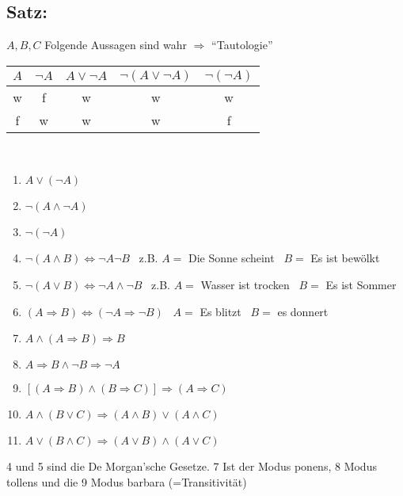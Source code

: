 \subsection{Satz:}
$A,B,C$ Folgende Aussagen sind wahr $\Rightarrow$ "`Tautologie"'
\begin{center}
\begin{tabular}{cc||ccc}
$A$ & $\neg A$ & $A \vee \neg A$ & $\neg(A\vee \neg A)$ & $\neg(\neg A)$\\ \hline
w & f & w & w & w\\
f & w & w & w & f\\
\end{tabular}
\end{center}
\quad\\
\begin{enumerate}
\item $A\vee(\neg A)$
\item $\neg (A \wedge \neg A)$
\item $\neg (\neg A)$
\item $\neg (A \wedge B) \Leftrightarrow \neg A \neg B$ \ z.B. $A=$ Die Sonne scheint \ $B=$ Es ist bewölkt
\item $\neg (A \vee B) \Leftrightarrow \neg A \wedge \neg B$ \ z.B. $A=$ Wasser ist trocken \ $B=$ Es ist Sommer
\item $(A\Rightarrow B) \Leftrightarrow (\neg A \Rightarrow \neg B)$ \ $A=$ Es blitzt \ $B=$ es donnert
\item $A \wedge (A \Rightarrow B) \Rightarrow B$
\item $A \Rightarrow B \wedge \neg B \Rightarrow \neg A$
\item $[(A\Rightarrow B) \wedge(B\Rightarrow C)]\Rightarrow(A\Rightarrow C)$
\item $A\wedge (B\vee C)\Rightarrow (A\wedge B)\vee(A\wedge C)$
\item $A \vee(B\wedge C) \Rightarrow (A\vee B) \wedge (A \vee C)$
\end{enumerate}
4 und 5 sind die De Morgan'sche Gesetze. 7 Ist der Modus ponens, 8 Modus tollens und die 9 Modus barbara (=Transitivität)\\
%
%
%
